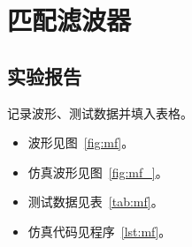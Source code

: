 \documentclass[../main]{subfiles}
\begin{document}
\chapter{匹配滤波器}%
\label{cha:mf}

\section{实验报告}%
\label{sec:\arabic{chapter}report}

\begin{Exercise}
  记录波形、测试数据并填入表格。
\end{Exercise}

\begin{Answer}
  \begin{itemize}
    \item 波形见图~\ref{fig:mf}。
    \item 仿真波形见图~\ref{fig:mf_}。
    \item 测试数据见表~\ref{tab:mf}。
    \item 仿真代码见程序~\ref{lst:mf}。
  \end{itemize}
\end{Answer}
\end{document}
